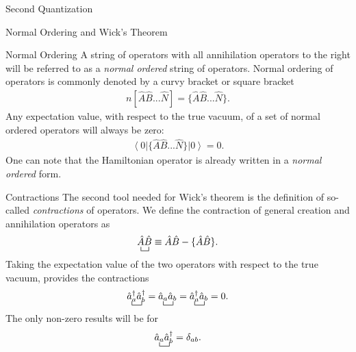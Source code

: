 \documentclass[twoside,english]{uiofysmaster}
\begin{document}
\begin{chapter}{Second Quantization}
\begin{section}{Normal Ordering and Wick's Theorem}
\begin{subsection}{Normal Ordering}
			A string of operators with all annihilation operators to the right will be referred to as a \textit{normal ordered} string of operators. Normal ordering of operators is commonly denoted by a curvy bracket or square bracket
			\begin{align}
				n[ \hat A \hat B ... \hat N ] = \{ \hat A \hat B ... \hat N \}.
			\end{align}
			Any expectation value, with respect to the true vacuum, of a set of normal ordered operators will always be zero:
			\begin{align}
				\left< 0 \right| \{ \hat A \hat B ... \hat N \} \left| 0 \right> = 0 .
				\label{NormalOrdering1}
			\end{align}
			One can note that the Hamiltonian operator is already written in a \textit{normal ordered} form. 
		\end{subsection}

		\begin{subsection}{Contractions}
			The second tool needed for Wick's theorem is
                        the definition of so-called \textit{contractions} of
                        operators. We define the contraction of
                        general creation and annihilation operators as
			\begin{align}
				\bcontraction{}{\hat A}{}{\hat B} 
				\hat A \hat B
				\equiv \hat A \hat B - \{ \hat A \hat B \}.
			\end{align}
			Taking the expectation value of the two operators with respect to the true vacuum, provides the contractions
			\begin{align}
				\bcontraction{}{\hat a_a^\dagger}{}{\hat a_b^\dagger}
				\hat a_a^\dagger \hat a_b^\dagger 
				= 
				\bcontraction{}{\hat a_a}{}{\hat a_b}
				\hat a_a \hat a_b
				= 
				\bcontraction{}{\hat a_a^\dagger}{}{\hat a_b}
				\hat a_a^\dagger \hat a_b
				= 0 .
			\end{align}
			The only non-zero results will be for 
			\begin{align}
				\bcontraction{}{\hat a_a}{}{\hat a_b}
				\hat a_a \hat a_b
				^\dagger = \delta_{ab}.
			\end{align}
		\end{subsection}
	

\end{section}
\end{chapter}
\end{document}
